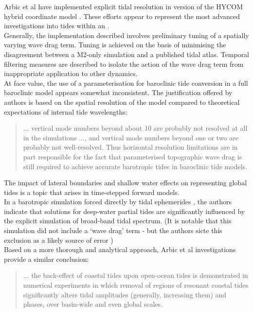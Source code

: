Arbic et al have implemented explicit tidal resolution in version of the HYCOM hybrid coordinate model \cite{Arbic:2005gv,Arbic:2009hf,Arbic:2010us,Arbic:hy}.  These efforts appear to represent the most advanced investigations into tides within an \OGCM{}.\\
Generally, the implementation described involves preliminary tuning of a spatially varying wave drag term.  Tuning is achieved on the basis of minimising the disagreement between a M2-only simulation and a published tidal atlas.   
Temporal filtering measures are described to isolate the action of the wave drag term from inappropriate application to other dynamics.  \\
At face value, the use of a parameterisation for baroclinic tide conversion in a full baroclinic model appears somewhat inconsistent.   The justification offered by authors is based on the spatial resolution of the model compared to theoretical expectations of internal tide wavelengths:
\noindent \begin{quotation}
$\dots{}$  vertical mode numbers beyond about 10 are probably not resolved at all in the simulations $\dots{}$, and vertical mode numbers beyond one or two are probably not well-resolved. Thus horizontal resolution limitations are in part responsible for the fact that parameterised topographic wave drag is still required to achieve accurate barotropic tides in baroclinic tide models. \citep[pp177]{Arbic:2010us}
\end{quotation}




The impact of lateral boundaries and shallow water effects on representing global tides is a topic that arises in time-stepped forward models.\\
In a barotropic simulation forced directly by tidal ephemerides \cite{Weis:2008ex}, the authors indicate that solutions for deep-water partial tides are significantly influenced by the explicit simulation of broad-band tidal spectrum.   
(It is notable that this simulation did not include a `wave drag' term - but the authors sicte this exclusion as a likely source of error \citep[pp5]{Weis:2008ex})\\
Based on a more thorough and analytical approach, Arbic et al investigations provide a similar conclusion:
\noindent \begin{quotation}
$\dots{}$ the back-effect of coastal tides upon open-ocean tides is demonstrated in numerical experiments in which removal of regions of resonant coastal tides significantly alters tidal amplitudes (generally, increasing them) and phases, over basin-wide and even global scales.\citep[pp263]{Arbic:2009in}
\end{quotation}

